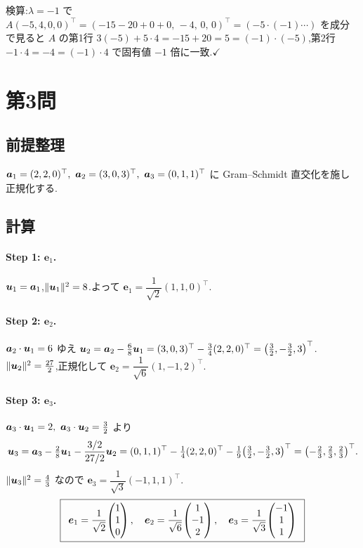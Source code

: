 \documentclass[11pt,a4paper]{article}
\begin{document}
検算:$\lambda=-1$ で $A(-5,4,0,0)^\top=(-15-20+0+0,\,-4,\,0,\,0)^\top=(-5\cdot(-1)\cdots)$
を成分で見ると $A$ の第1行 $3(-5)+5\cdot4=-15+20=5=(-1)\cdot(-5)$,第2行 $-1\cdot4=-4=(-1)\cdot4$
で固有値 $-1$ 倍に一致.$\checkmark$

\section*{第3問}

\subsection*{前提整理}

$\va_1=(2,2,0)^\top,\ \va_2=(3,0,3)^\top,\ \va_3=(0,1,1)^\top$ に
Gram--Schmidt 直交化を施し正規化する.

\subsection*{計算}

\paragraph{Step 1: $\bm{e}_1$.}
$\bm{u}_1=\bm{a}_1$,$\|\bm{u}_1\|^2=8$.よって $\bm{e}_1=\dfrac{1}{\sqrt2}(1,1,0)^\top$.

\paragraph{Step 2: $\bm{e}_2$.}
$\bm{a}_2\cdot\bm{u}_1=6$ ゆえ
$\bm{u}_2=\bm{a}_2-\tfrac68\bm{u}_1=(3,0,3)^\top-\tfrac34(2,2,0)^\top=\bigl(\tfrac32,-\tfrac32,3\bigr)^\top$.
$\|\bm{u}_2\|^2=\tfrac{27}{2}$,正規化して $\bm{e}_2=\dfrac{1}{\sqrt6}(1,-1,2)^\top$.

\paragraph{Step 3: $\bm{e}_3$.}
$\va_3\cdot\vu_1=2,\ \va_3\cdot\vu_2=\tfrac32$ より
\[
\bm{u}_3=\bm{a}_3-\tfrac28\bm{u}_1-\frac{3/2}{27/2}\bm{u}_2
=(0,1,1)^\top-\tfrac14(2,2,0)^\top-\tfrac19\bigl(\tfrac32,-\tfrac32,3\bigr)^\top
=\bigl(-\tfrac23,\tfrac23,\tfrac23\bigr)^\top.
\]
$\|\bm{u}_3\|^2=\tfrac43$ なので $\bm{e}_3=\dfrac{1}{\sqrt3}(-1,1,1)^\top$.
\[
\ans{\
\bm{e}_1=\frac{1}{\sqrt2}\!\begin{pmatrix}1\\1\\0\end{pmatrix},\quad
\bm{e}_2=\frac{1}{\sqrt6}\!\begin{pmatrix}1\\-1\\2\end{pmatrix},\quad
\bm{e}_3=\frac{1}{\sqrt3}\!\begin{pmatrix}-1\\1\\1\end{pmatrix}\ }
\]
\end{document}
